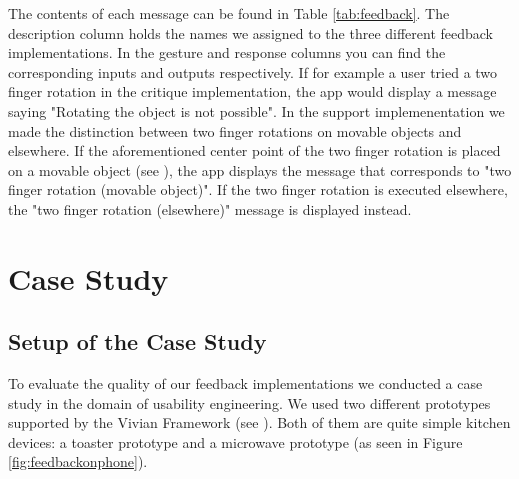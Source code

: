 \documentclass[11pt, a4paper]{article}
\begin{document}
		The contents of each message can be found in Table \ref{tab:feedback}. The description column holds the names we assigned to the three different feedback implementations. In the gesture and response columns you can find the corresponding inputs and outputs respectively. If for example a user tried a two finger rotation in the critique implementation, the app would display a message saying "Rotating the object is not possible".
		In the support implemenentation we made the distinction between two finger rotations on movable objects and elsewhere. If the aforementioned center point of the two finger rotation is placed on a movable object (see ), the app displays the message that corresponds to "two finger rotation (movable object)". If the two finger rotation is executed elsewhere, the "two finger rotation (elsewhere)" message is displayed instead.

	\section*{Case Study}\label{sec:casestudy}
		\subsection*{Setup of the Case Study}\label{ssec:setup}
			To evaluate the quality of our feedback implementations we conducted a case study in the domain of usability engineering. We used two different prototypes supported by the Vivian Framework (see ). Both of them are quite simple kitchen devices: a toaster prototype and a microwave prototype (as seen in Figure \ref{fig:feedbackonphone}).
\end{document}
